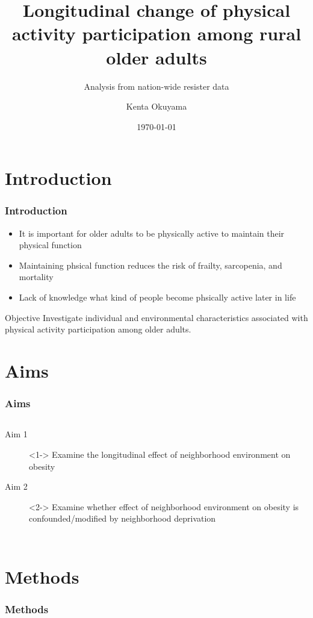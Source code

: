\documentclass{beamer}
\title{Longitudinal change of physical activity participation among rural older adults}
\subtitle{Analysis from nation-wide resister data}
\author{Kenta Okuyama\inst{1}}
\institute{\inst{1}Center for Primary Health Care Research \\
Lund University}
\date{\today}
\begin{document}
\begin{frame}
\titlepage
\end{frame}

\section{Introduction} %
\begin{frame} %
\frametitle{Introduction}
\begin{itemize}
	\item It is important for older adults to be physically active \alert{to maintain their physical function} \pause

	\item Maintaining phsical function \alert{reduces the risk of frailty, sarcopenia, and mortality} \pause

	\item Lack of knowledge \alert{what kind of people become phsically active} later in life \pause
\end{itemize}
\begin{block}{Objective}
	Investigate individual and environmental characteristics associated with physical activity participation among older adults.
\end{block}
\end{frame}

\section{Aims}
\begin{frame} %
\frametitle{Aims}
\begin{columns}
	\begin{description}
		\item[Aim 1]<1-> Examine the longitudinal effect of neighborhood environment on obesity
		\item[Aim 2]<2-> Examine whether effect of neighborhood environment on obesity is confounded/modified by neighborhood deprivation 
	\end{description}
\end{columns}
\end{frame}

\section{Methods}
\begin{frame}
\frametitle{Methods}
\end{frame}
\end{document}

